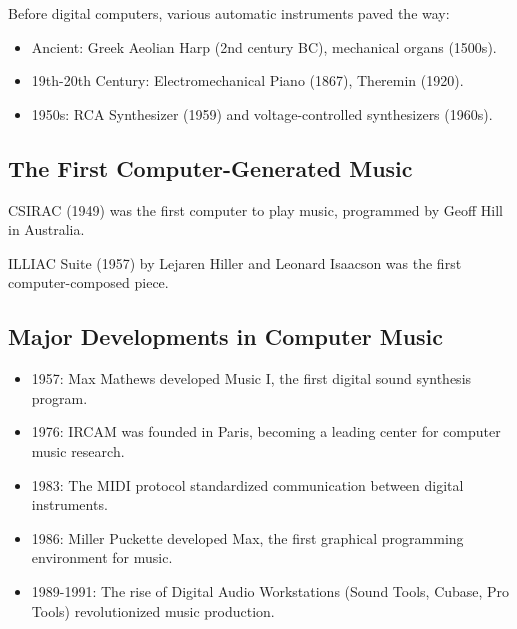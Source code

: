 Before digital computers, various automatic instruments paved the way:

\begin{itemize}
    \item Ancient: Greek Aeolian Harp (2nd century BC), mechanical organs (1500s).
    \item 19th-20th Century: Electromechanical Piano (1867), Theremin (1920).
    \item 1950s: RCA Synthesizer (1959) and voltage-controlled synthesizers (1960s).
\end{itemize}

\subsection{The First Computer-Generated Music}

CSIRAC (1949) was the first computer to play music, programmed by Geoff Hill in Australia.

ILLIAC Suite (1957) by Lejaren Hiller and Leonard Isaacson was the first computer-composed piece.

\subsection{Major Developments in Computer Music}

\begin{itemize}
    \item 1957: Max Mathews developed Music I, the first digital sound synthesis program.
    \item 1976: IRCAM was founded in Paris, becoming a leading center for computer music research.
    \item 1983: The MIDI protocol standardized communication between digital instruments.
    \item 1986: Miller Puckette developed Max, the first graphical programming environment for music.
    \item 1989-1991: The rise of Digital Audio Workstations (Sound Tools, Cubase, Pro Tools) revolutionized music production.
\end{itemize}
